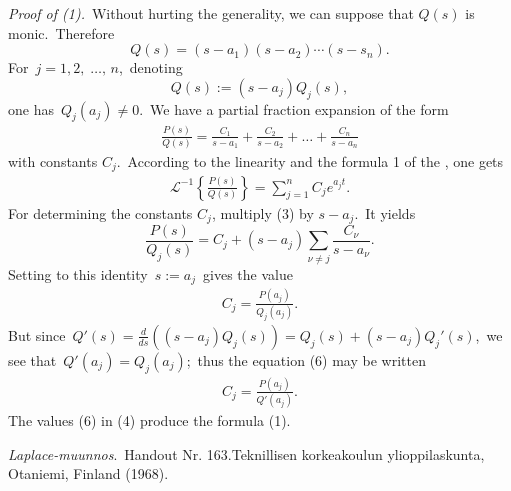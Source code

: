 \documentclass[12pt]{article}
\theoremstyle{definition}
\begin{document}
{\it Proof of (1).}\, Without hurting the generality, we can 
suppose that $Q(s)$ is monic.\, Therefore
$$Q(s) = (s\!-\!a_1)(s\!-\!a_2)\cdots(s\!-\!s_n).$$
For\, $j = 1,2,\;\ldots,\,n$,\, denoting
$$Q(s) := (s\!-\!a_j)Q_j(s),$$
one has\, $Q_j(a_j) \neq 0$.\, We have a partial fraction 
expansion of the form
\begin{align}
\frac{P(s)}{Q(s)} = \frac{C_1}{s\!-\!a_1}+\frac{C_2}{s\!-\!a_2}+\ldots+\frac{C_n}{s\!-\!a_n}
\end{align}
with constants $C_j$.\, According to the linearity and the 
formula 1 of the , 
one gets
\begin{align}
\mathcal{L}^{-1}\left\{\frac{P(s)}{Q(s)}\right\} 
= \sum_{j=1}^nC_je^{a_jt}.
\end{align}
For determining the constants $C_j$, multiply (3) by 
$s\!-\!a_j$.\, It yields
$$\frac{P(s)}{Q_j(s)} 
= C_j+(s\!-\!a_j)\sum_{\nu \neq j}\frac{C_\nu}{s\!-\!a_\nu}.$$
Setting to this identity \,$s := a_j$\, gives the value
\begin{align}
C_j = \frac{P(a_j)}{Q_j(a_j)}.
\end{align}
But since\, $Q'(s) = \frac{d}{ds}((s\!-\!a_j)Q_j(s)) 
= Q_j(s)\!+\!(s\!-\!a_j)Q_j'(s)$,\, 
we see that\, $Q'(a_j) = Q_j(a_j)$;\, thus the equation (6) may 
be written
\begin{align}
C_j = \frac{P(a_j)}{Q'(a_j)}.
\end{align}
The values (6) in (4) produce the formula (1).

\begin{thebibliography}{9}
 {\em Laplace-muunnos}.\, Handout Nr. 163.\quad Teknillisen korkeakoulun ylioppilaskunta, Otaniemi, Finland (1968).
\end{thebibliography}
\end{document}
